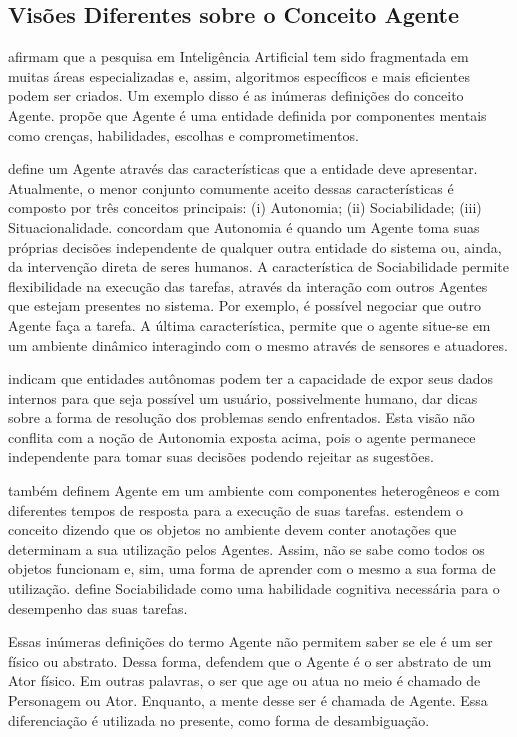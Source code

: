 \subsection{Visões Diferentes sobre o Conceito Agente} \label{sec:aopca}

\citet{laird2001human} afirmam que a pesquisa em Inteligência Artificial tem
sido fragmentada em muitas áreas especializadas e, assim, algoritmos
específicos e mais eficientes podem ser criados. Um exemplo disso é as
inúmeras definições do conceito Agente. \citet{shoham1993agent}
propõe que Agente é uma entidade definida por componentes mentais como
crenças, habilidades, escolhas e comprometimentos.

\citet{franklin1997agent} define um Agente através das características que a
entidade deve apresentar.  Atualmente, o menor conjunto comumente aceito
dessas características é composto por três conceitos principais: (i)
Autonomia; (ii) Sociabilidade; (iii) Situacionalidade.
\citet{roadmap,fatemeh2009multi} concordam que Autonomia é quando um Agente
toma suas próprias decisões independente de qualquer outra entidade do sistema
ou, ainda, da intervenção direta de seres humanos. A característica de
Sociabilidade permite flexibilidade na execução das tarefas, através da
interação com outros Agentes que estejam presentes no sistema. Por exemplo, é
possível negociar que outro Agente faça a tarefa. A última característica,
permite que o agente situe-se em um ambiente dinâmico interagindo com o mesmo
através de sensores e atuadores.

\citet{ingrand1992architecture} indicam que entidades autônomas podem ter a
capacidade de expor seus dados internos para que seja possível um usuário,
possivelmente humano, dar dicas sobre a forma de resolução dos problemas sendo
enfrentados. Esta visão não conflita com a noção de Autonomia exposta acima,
pois o agente permanece independente para tomar suas decisões podendo rejeitar
as sugestões.

 também definem Agente em um ambiente com
componentes heterogêneos e com diferentes tempos de resposta para a execução
de suas tarefas. \citet{doyle1998annotated} estendem o conceito dizendo que os
objetos no ambiente devem conter anotações que determinam a sua utilização
pelos Agentes. Assim, não se sabe como todos os objetos funcionam e, sim, uma
forma de aprender com o mesmo a sua forma de utilização.
\citet{shoham1993agent} define Sociabilidade como uma habilidade cognitiva
necessária para o desempenho das suas tarefas.

Essas inúmeras definições do termo Agente não permitem saber se ele é um ser
físico ou abstrato. Dessa forma, \citet{nareyek2001review,damiano2008emotions}
defendem que o Agente é o ser abstrato de um Ator físico. Em outras palavras,
o ser que age ou atua no meio é chamado de Personagem ou Ator. Enquanto, a
mente desse ser é chamada de Agente. Essa diferenciação é utilizada no
presente, como forma de desambiguação.
